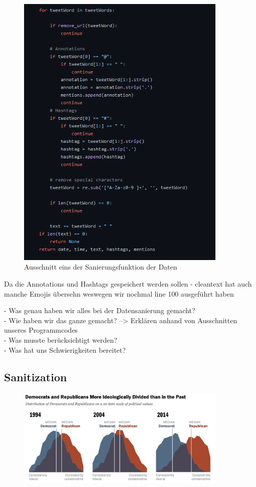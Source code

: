 	\begin{figure}[ht]
		\centering
		\includegraphics[width=0.9\textwidth]{images/Kapitel2/Code_Datensanierung_3}
		\caption{\label{fig:DataSanF1}Ausschnitt eins der Sanierungsfunktion der Daten}
	\end{figure}

	Da die Annotations und Hashtags gespeichert werden sollen
	- cleantext hat auch manche Emojis übersehn weswegen wir nochmal line 100 ausgeführt haben	
	
	- Was genau haben wir alles bei der Datensanierung gemacht?\\
	- Wie haben wir das ganze gemacht? --> Erklären anhand von Ausschnitten unseres Programmcodes\\
	
	- Was musste berücksichtigt werden?\\
	- Was hat uns Schwierigkeiten bereitet?	
	
	
	\subsection{Sanitization}
	

	
	\begin{figure}[ht]
		\centering
		\includegraphics[width=0.9\textwidth]{images/Kapitel1/PoliticalPolarization}
	\end{figure}
	
	
